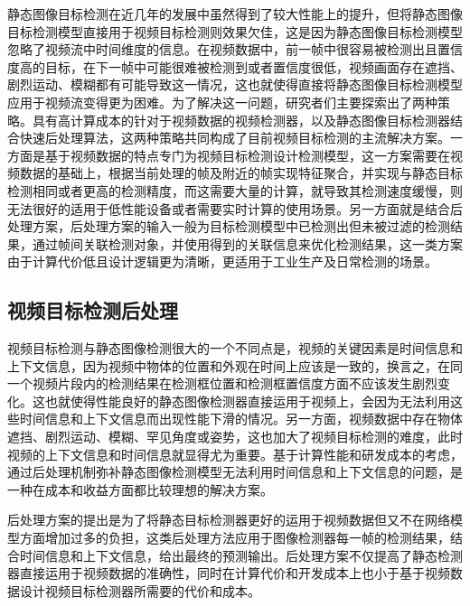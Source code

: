 \documentclass[winfonts,master,twoside,AutoFakeBold= {2}]{njuthesis}
\begin{document}
静态图像目标检测在近几年的发展中虽然得到了较大性能上的提升，但将静态图像目标检测模型直接用于视频目标检测则效果欠佳，这是因为静态图像目标检测模型忽略了视频流中时间维度的信息。在视频数据中，前一帧中很容易被检测出且置信度高的目标，在下一帧中可能很难被检测到或者置信度很低，视频画面存在遮挡、剧烈运动、模糊都有可能导致这一情况，这也就使得直接将静态图像目标检测模型应用于视频流变得更为困难。为了解决这一问题，研究者们主要探索出了两种策略。具有高计算成本的针对于视频数据的视频检测器，以及静态图像目标检测器结合快速后处理算法，这两种策略共同构成了目前视频目标检测的主流解决方案。一方面是基于视频数据的特点专门为视频目标检测设计检测模型，这一方案需要在视频数据的基础上，根据当前处理的帧及附近的帧实现特征聚合，并实现与静态目标检测相同或者更高的检测精度，而这需要大量的计算，就导致其检测速度缓慢，则无法很好的适用于低性能设备或者需要实时计算的使用场景。另一方面就是结合后处理方案，后处理方案的输入一般为目标检测模型中已检测出但未被过滤的检测结果，通过帧间关联检测对象，并使用得到的关联信息来优化检测结果，这一类方案由于计算代价低且设计逻辑更为清晰，更适用于工业生产及日常检测的场景。

\subsection{视频目标检测后处理}
视频目标检测与静态图像检测很大的一个不同点是，视频的关键因素是时间信息和上下文信息，因为视频中物体的位置和外观在时间上应该是一致的，换言之，在同一个视频片段内的检测结果在检测框位置和检测框置信度方面不应该发生剧烈变化。这也就使得性能良好的静态图像检测器直接运用于视频上，会因为无法利用这些时间信息和上下文信息而出现性能下滑的情况。另一方面，视频数据中存在物体遮挡、剧烈运动、模糊、罕见角度或姿势，这也加大了视频目标检测的难度，此时视频的上下文信息和时间信息就显得尤为重要。基于计算性能和研发成本的考虑，通过后处理机制弥补静态图像检测模型无法利用时间信息和上下文信息的问题，是一种在成本和收益方面都比较理想的解决方案。

后处理方案的提出是为了将静态目标检测器更好的运用于视频数据但又不在网络模型方面增加过多的负担，这类后处理方法应用于图像检测器每一帧的检测结果，结合时间信息和上下文信息，给出最终的预测输出。后处理方案不仅提高了静态检测器直接运用于视频数据的准确性，同时在计算代价和开发成本上也小于基于视频数据设计视频目标检测器所需要的代价和成本。
\end{document}
